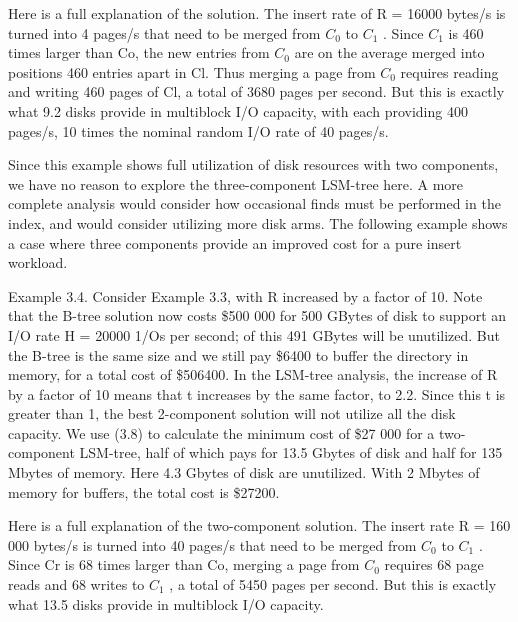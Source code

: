 \documentclass[a4paper,12pt,notitlepage,twoside,openright]{article}
\begin{document}
Here is a full explanation of the solution. The insert rate of R = 16000
bytes/s is turned into 4 pages/s that need to be merged from \(C_0\) to \(C_1\) .
Since \(C_1\) is 460 times larger than Co, the new entries from \(C_0\) are on the
average merged into positions 460 entries apart in Cl. Thus merging a
page from \(C_0\) requires reading and writing 460 pages of Cl, a total of
3680 pages per second. But this is exactly what 9.2 disks provide in
multiblock I/O capacity, with each providing 400 pages/s, 10 times the
nominal random I/O rate of 40 pages/s.

Since this example shows full utilization of disk resources with two
components, we have no reason to explore the three-component LSM-tree
here. A more complete analysis would consider how occasional finds must
be performed in the index, and would consider utilizing more disk arms.
The following example shows a case where three components provide an
improved cost for a pure insert workload.

Example 3.4. Consider Example 3.3, with R increased by a factor of 10.
Note that the B-tree solution now costs \$500 000 for 500 GBytes of disk
to support an I/O rate H = 20000 1/Os per second; of this 491 GBytes
will be unutilized. But the B-tree is the same size and we still pay
\$6400 to buffer the directory in memory, for a total cost of \$506400.
In the LSM-tree analysis, the increase of R by a factor of 10 means that
t increases by the same factor, to 2.2. Since this t is greater than 1,
the best 2-component solution will not utilize all the disk capacity. We
use (3.8) to calculate the minimum cost of \$27 000 for a two-component
LSM-tree, half of which pays for 13.5 Gbytes of disk and half for 135
Mbytes of memory. Here 4.3 Gbytes of disk are unutilized. With 2 Mbytes
of memory for buffers, the total cost is \$27200.

Here is a full explanation of the two-component solution. The insert
rate R = 160 000 bytes/s is turned into 40 pages/s that need to be
merged from \(C_0\) to \(C_1\) . Since Cr is 68 times larger than Co, merging a
page from \(C_0\) requires 68 page reads and 68 writes to \(C_1\) , a total of
5450 pages per second. But this is exactly what 13.5 disks provide in
multiblock I/O capacity.
\end{document}
